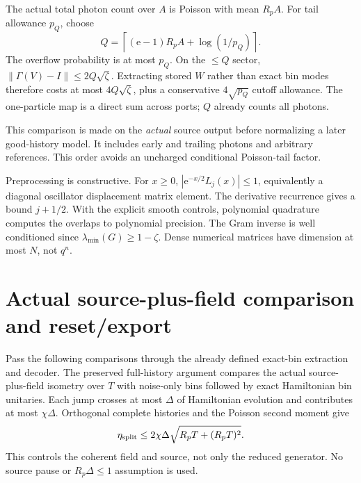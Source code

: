 \documentclass[11pt,a4paper]{article}
\newcommand{\norm}[1]{\left\lVert #1\right\rVert}\newcommand{\ket}[1]{\lvert #1\rangle}\newcommand{\bra}[1]{\langle #1\rvert}
\newcommand{\ee}{\mathrm e}
\begin{document}
The actual total photon count over $A$ is Poisson with mean $R_pA$. For tail allowance $p_Q$, choose
\begin{equation}
 Q=\left\lceil(\ee-1)R_pA+\log(1/p_Q)\right\rceil.
 \label{eq:cap}
\end{equation}
The overflow probability is at most $p_Q$. On the $\le Q$ sector, $\norm{\Gamma(V)-I}\le2Q\sqrt\zeta$. Extracting stored $W$ rather than exact bin modes therefore costs at most $4Q\sqrt\zeta$, plus a conservative $4\sqrt{p_Q}$ cutoff allowance. The one-particle map is a direct sum across ports; $Q$ already counts all photons.

This comparison is made on the \emph{actual} source output before normalizing a later good-history model. It includes early and trailing photons and arbitrary references. This order avoids an uncharged conditional Poisson-tail factor.

Preprocessing is constructive. For $x\ge0$, $|\ee^{-x/2}L_j(x)|\le1$, equivalently a diagonal oscillator displacement matrix element. The derivative recurrence gives a bound $j+1/2$. With the explicit smooth controls, polynomial quadrature computes the overlaps to polynomial precision. The Gram inverse is well conditioned since $\lambda_{\min}(G)\ge1-\zeta$. Dense numerical matrices have dimension at most $N$, not $q^n$.

\section{Actual source-plus-field comparison and reset/export}

Pass the following comparisons through the already defined exact-bin extraction and decoder. The preserved full-history argument compares the actual source-plus-field isometry over $T$ with noise-only bins followed by exact Hamiltonian bin unitaries. Each jump crosses at most $\Delta$ of Hamiltonian evolution and contributes at most $\chi\Delta$. Orthogonal complete histories and the Poisson second moment give
\begin{equation}
 \eta_{\rm split}\le2\chi\Delta\sqrt{R_pT+(R_pT)^2}.
 \label{eq:split}
\end{equation}
This controls the coherent field and source, not only the reduced generator. No source pause or $R_p\Delta\le1$ assumption is used.
\end{document}
